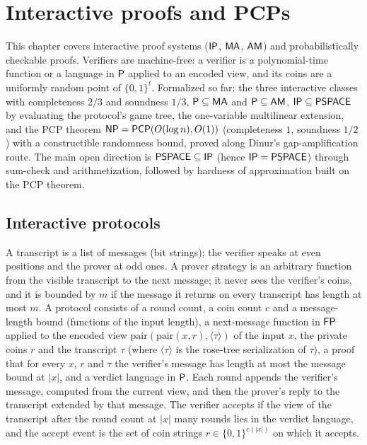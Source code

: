 \chapter{Interactive proofs and PCPs}
\label{chap:interaction}

This chapter covers interactive proof systems ($\mathsf{IP}$, $\mathsf{MA}$,
$\mathsf{AM}$) and probabilistically checkable proofs. Verifiers are machine-free:
a verifier is a polynomial-time function or a language in $\mathsf{P}$ applied to
an encoded view, and its coins are a uniformly random point of
$\{0,1\}^t$. Formalized so far: the three interactive classes with
completeness $2/3$ and soundness $1/3$, $\mathsf{P} \subseteq \mathsf{MA}$ and
$\mathsf{P} \subseteq \mathsf{AM}$, $\mathsf{IP} \subseteq \mathsf{PSPACE}$ by evaluating the
protocol's game tree, the one-variable multilinear extension, and the PCP
theorem $\mathsf{NP} = \mathsf{PCP}(O(\log n), O(1))$ (completeness $1$, soundness
$1/2$) with a constructible randomness bound, proved along Dinur's
gap-amplification route. The main open direction is
$\mathsf{PSPACE} \subseteq \mathsf{IP}$ (hence $\mathsf{IP} = \mathsf{PSPACE}$) through
sum-check and arithmetization, followed by hardness of approximation built on
the PCP theorem.

\section{Interactive protocols}

\begin{definition}
  \label{def:interaction-protocol}
  \leanok
  A transcript is a list of messages (bit strings); the verifier speaks at
  even positions and the prover at odd ones. A prover strategy is an arbitrary
  function from the visible transcript to the next message; it never sees the
  verifier's coins, and it is bounded by $m$ if the message it returns on
  every transcript has length at most $m$. A protocol consists of a round
  count, a coin count $c$ and a message-length bound (functions of the input
  length), a next-message function in $\mathsf{FP}$ applied to the encoded view
  $\mathrm{pair}(\mathrm{pair}(x, r), \langle \tau \rangle)$ of the input $x$,
  the private coins $r$ and the transcript $\tau$ (where
  $\langle \tau \rangle$ is the rose-tree serialization of $\tau$), a proof
  that for every $x$, $r$ and $\tau$ the verifier's message has length at most
  the message bound at $|x|$, and a verdict language in $\mathsf{P}$. Each round
  appends the verifier's message, computed from the current view, and then the
  prover's reply to the transcript extended by that message. The verifier
  accepts if the view of the transcript after the round count at $|x|$ many
  rounds lies in the verdict language, and the accept event is the set of coin
  strings $r \in \{0,1\}^{c(|x|)}$ on which it accepts.
\end{definition}

